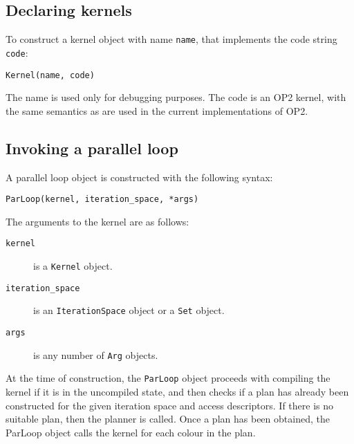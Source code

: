 \documentclass[a4paper]{article}
\begin{document}
\subsection{Declaring kernels}

To construct a kernel object with name \verb|name|, that implements the code string \verb|code|:

\begin{verbatim}
Kernel(name, code)
\end{verbatim}

The name is used only for debugging purposes. The code is an OP2 kernel, with the same semantics as are used in the current implementations of OP2.

\subsection{Invoking a parallel loop}

A parallel loop object is constructed with the following syntax:

\begin{verbatim}
ParLoop(kernel, iteration_space, *args)
\end{verbatim}

The arguments to the kernel are as follows:

\begin{description}
  \item[\texttt{kernel}] is a \verb|Kernel| object.
  \item[\texttt{iteration\_space}] is an \verb|IterationSpace| object or a \verb|Set| object.
  \item[\texttt{args}] is any number of \verb|Arg| objects.
\end{description}

At the time of construction, the \verb|ParLoop| object proceeds with compiling the kernel if it is in the uncompiled state, and then checks if a plan has already been constructed for the given iteration space and access descriptors. If there is no suitable plan, then the planner is called. Once a plan has been obtained, the ParLoop object calls the kernel for each colour in the plan.
\end{document}
